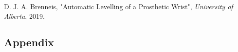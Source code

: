 \documentclass[letterpaper,12pt]{article}
\begin{document}
\begin{thebibliography}{99}
D. J. A. Brenneis, "Automatic Levelling of a Prosthetic Wrist", \textit{University of Alberta}, 2019.
%
%
%
%
%
%
%
%
%
%
%
%
%
%

\end{thebibliography}

\begin{appendices}
\section{Appendix}
\end{appendices}
\end{document}
